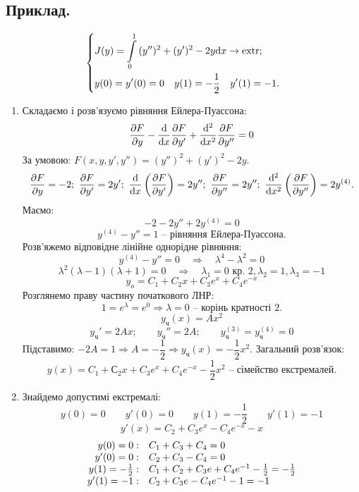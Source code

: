 \subsection*{Приклад.}
$$
\begin{dcases}
 J(y) =  \int\limits_{0}^{1}{ (y'')^2 + (y')^2 - 2 y  \mathrm{d} x } \to \mathrm{extr};\\
 y(0) = y' (0) = 0 \quad y(1) = - \frac{1}{2} \quad y'(1) = -1 .
\end{dcases}
$$
\begin{enumerate}
  \item Складаємо і розв'язуємо рівняння Ейлера-Пуассона:
  $$
  \frac{\d F}{\d y} - \frac{\mathrm{d}}{\mathrm{d} x} \frac{\d F}{\d y'} + \frac{\mathrm{d}^2}{ \mathrm{d} x ^2} \frac{\d F}{\d y''} = 0
  $$
  За умовою: $ F(x, y, y', y'') = (y'')^2 + (y' )^2 - 2y$.
  $$
  \frac{
  \d F
  }{
\d y
  } = -2 ; \  \frac{\d F}{\d y'} = 2 y' ; \  \frac{\mathrm{d}}{\mathrm{d} x} \left( \frac{\d F}{
  \d y'
  }  \right)  = 2 y'' ; \  \frac{\d F}{\d y''
  }  = 2y''; \  \frac{\mathrm{d}^2}{ \mathrm{d} x^2} \left( \frac{\d F}{\d y''}  \right)  = 2 y^{(4)}.
  $$
Маємо:
$$
-2 - 2 y'' + 2 y^{(4)} = 0
$$
$$
y^{(4)} - y'' = 1 \text{ -- рівняння Ейлера-Пуассона.}
$$
Розв'яжемо відповідне лінійне однорідне рівняння:
$$
y^{(4)} - y'' = 0
\quad \Longrightarrow \quad \lambda^4 - \lambda^2 = 0
$$
$$
\lambda^2 (\lambda-1) (\lambda+1 ) = 0 \quad \Longrightarrow \quad \lambda_1 = 0 \text{ кр. 2} ,
\lambda_2 = 1 , \lambda_3 = -1
$$
$$
y_o = C_1 + C_2x + C_3 e^x + C_4 e^{-x}
$$
Розглянемо праву частину початкового ЛНР:
$$
1 = e^{\lambda} = e^0  \Longrightarrow \lambda = 0 \text{ -- корінь кратності 2.}
$$
$$
y_{\text{ч}} (x) = Ax^2
$$
$$
y_{\text{ч}}' = 2Ax ; \qquad  y_{\text{ч}}'' = 2 A ; \qquad  y_{\text{ч}}^{(3)} = y_{\text{ч}}^{(4)} = 0
$$
Підставимо: $-2 A = 1 \Rightarrow A= - \dfrac{1}{2} \Rightarrow y_{\text{ч}}(x) = -  \dfrac{1}{2} x^2$. Загальний розв'язок:
$$
y(x) = C_1 + С_2 x + C_3 e^x + C_4 e^{-x} - \frac{1}{2} x^2 \textit{ -- сімейство екстремалей.}
$$
\item Знайдемо допустимі екстремалі:
$$
y(0) = 0 \qquad y'(0) =0 \qquad y(1) = -  \frac{1}{2}  \qquad y' (1) = -1
$$
$$
y' (x) = C_2 + C_3 e^{x} - C_4 e^{-x} - x
$$
$$
\begin{array}{r l}
y(0) = 0: & C_1 + C_3 + C_4 = 0\\
y'(0) = 0 : &C_2 + C_3 - C_4 = 0 \\
y(1) = - \frac{1}{2} : &  C_1 + C_2 + C_3 e + C_4 e^{-1 } - \frac{1}{2} = - \frac{1}{2}\\
y'(1) = -1 : & C_2 + C_3 e - C_4 e^{-1}  -1 = -1

\end{array}$$
\end{enumerate}
